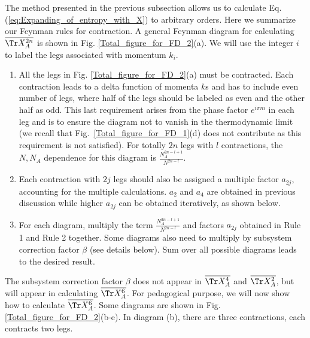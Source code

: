 
The method presented in the previous subsection allows us to calculate
Eq. (\ref{eq:Expanding_of_entropy_with_X}) to arbitrary orders. Here
we summarize our Feynman rules for contraction. A general Feynman diagram
for calculating $\overline{\Tr X_{A}^{2n}}$ is shown in Fig. \ref{Total_figure_for_FD_2}(a).
We will use the integer $i$ to label the legs associated with momentum
$k_{i}$. 
\begin{enumerate}
\item All the legs in Fig. \ref{Total_figure_for_FD_2}(a) must be contracted.  Each contraction leads to a delta function of momenta $k$s and has to include even number of legs, where half of the legs should be labeled
as even and the other half as odd. This last requirement arises from the phase factor $e^{i\pi m}$ in each leg and is to ensure the diagram %
not to vanish in the thermodynamic limit %
(we recall that Fig.~\ref{Total_figure_for_FD_1}(d) does not contribute as this requirement is not satisfied). For totally $2n$ legs with $l$ contractions, the $N,N_{A}$ dependence for this diagram is
$\frac{N_{A}^{2n-l+1}}{N^{2n-l}}$.
\item Each contraction with $2j$ legs should also be assigned a multiple
factor $a_{2j}$, accounting for the multiple calculations. $a_{2}$ and $a_{4}$ are obtained in previous discussion while higher $a_{2j}$ can be obtained iteratively, as shown below.
\item For each diagram, multiply the term $\frac{N_{A}^{2n-l+1}}{N^{2n-l}}$ and factors $a_{2j}$ obtained in Rule 1 and Rule 2 together. Some diagrams also need to multiply by subsystem correction factor $\beta$ (see details below). Sum over all possible diagrams leads to the desired result.
\end{enumerate}
The subsystem correction factor $\beta$ does not appear in $\overline{\Tr X_{A}^{4}}$ and $\overline{\Tr X_{A}^{2}}$, but will appear in calculating $\overline{\Tr X_{A}^{6}}$. For pedagogical purpose, we will now show how to calculate $\overline{\Tr X_{A}^{6}}$. Some diagrams are shown in Fig. \ref{Total_figure_for_FD_2}(b-e).
In diagram (b), there are three contractions, each contracts two legs.
